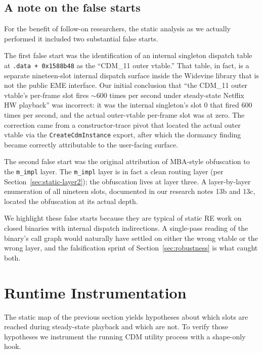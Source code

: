\documentclass[11pt,letterpaper]{article}
\begin{document}
\subsection{A note on the false starts}
\label{sec:static-false}

For the benefit of follow-on researchers, the static analysis as we
actually performed it included two substantial false starts.

The first false start was the identification of an internal
singleton dispatch table at \texttt{.data + 0x1588b48} as the
``CDM\_11 outer vtable.'' That table, in fact, is a separate
nineteen-slot internal dispatch surface inside the Widevine library
that is not the public EME interface. Our initial conclusion that
``the CDM\_11 outer vtable's per-frame slot fires
$\sim$600 times per second under steady-state Netflix HW playback''
was incorrect: it was the internal singleton's slot 0 that fired
600 times per second, and the actual outer-vtable per-frame slot
was at zero. The correction came from a constructor-trace pivot
that located the actual outer vtable via the
\texttt{CreateCdmInstance} export, after which the dormancy finding
became correctly attributable to the user-facing surface.

The second false start was the original attribution of MBA-style
obfuscation to the \texttt{m\_impl} layer. The \texttt{m\_impl}
layer is in fact a clean routing layer (per
Section~\ref{sec:static-layer2}); the obfuscation lives at layer
three. A layer-by-layer enumeration of all nineteen slots,
documented in our research notes 13b and 13c, located the
obfuscation at its actual depth.

We highlight these false starts because they are typical of static
RE work on closed binaries with internal dispatch indirections.
A single-pass reading of the binary's call graph would naturally
have settled on either the wrong vtable or the wrong layer, and
the falsification sprint of Section~\ref{sec:robustness} is what
caught both.

\section{Runtime Instrumentation}
\label{sec:runtime}

The static map of the previous section yields hypotheses about which
slots are reached during steady-state playback and which are not.
To verify those hypotheses we instrument the running CDM utility
process with a shape-only hook.
\end{document}

